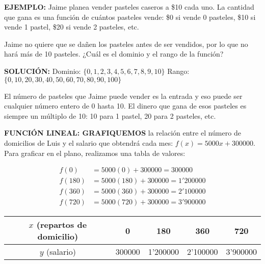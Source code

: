\documentclass[12pt,a4paper]{article}
\begin{document}
\begin{tcolorbox}[colback=fondorosa,colframe=rojoclaro,breakable]
\vspace{0.5cm}

\textbf{EJEMPLO:} Jaime planea vender pasteles caseros a \$10 cada uno. La cantidad que gana es una función de cuántos pasteles vende: \$0 si vende 0 pasteles, \$10 si vende 1 pastel, \$20 si vende 2 pasteles, etc.

Jaime no quiere que se dañen los pasteles antes de ser vendidos, por lo que no hará más de 10 pasteles. ¿Cuál es el dominio y el rango de la función?

\textbf{SOLUCIÓN:} Dominio: $\{0, 1, 2, 3, 4, 5, 6, 7, 8, 9, 10\}$ \quad Rango: $\{0, 10, 20, 30, 40, 50, 60, 70, 80, 90, 100\}$

El número de pasteles que Jaime puede vender es la entrada y eso puede ser cualquier número entero de 0 hasta 10. El dinero que gana de esos pasteles es siempre un múltiplo de 10: 10 para 1 pastel, 20 para 2 pasteles, etc.

\end{tcolorbox}

\vspace{5mm}


\textbf{FUNCIÓN LINEAL: GRAFIQUEMOS} la relación entre el número de domicilios de Luis y el salario que obtendrá cada mes: $f(x) = 5000x + 300000$. Para graficar en el plano, realizamos una tabla de valores:

\begin{align*}
f(0) &= 5000(0) + 300000 = 300000 \\
f(180) &= 5000(180) + 300000 = 1'200000 \\
f(360) &= 5000(360) + 300000 = 2'100000 \\
f(720) &= 5000(720) + 300000 = 3'900000
\end{align*}

\begin{center}
\begin{tabular}{|c|c|c|c|c|}
\hline
$x$ (repartos de domicilio) & 0 & 180 & 360 & 720 \\
\hline
$y$ (salario) & 300000 & 1'200000 & 2'100000 & 3'900000 \\
\hline
\end{tabular}
\end{center}
\end{document}
